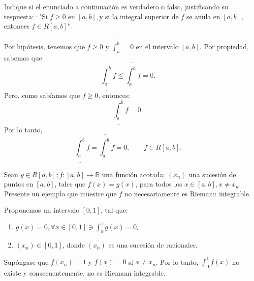 \begin{problema}
	Indique si el enunciado a continuación es verdadero o falso, justificando su
	respuesta:·"Si $f \geq 0$ en $[a, b], \mathrm{y}$ si la integral superior de $f$ se anula en $[a, b]$,
	entonces $f \in R[a, b]$".
\end{problema}
\begin{dem}
	Por hipótesis, tenemos que $f\geq 0$ y $\overline{\int_a^b}=0$ en el intervalo $[a,b]$. Por propiedad, sabemos que 
	$$ \underline{\int_a^b}f\leq \overline{\int_a^b}f=0.$$
	Pero, como sabíamos que $f\geq 0$, entonces: 
	$$\underline{\int_a^b}f=0.$$
	Por lo tanto, 
	$$\underline{\int_a^b}f= \overline{\int_a^b}f =0, \qquad f\in R[a,b].$$ 
\end{dem}





\begin{problema}
	 Sean $g \in R[a, b] ; f:[a, b] \rightarrow \mathbb{R}$ una función acotada; $\left(x_{n}\right)$ una sucesión de puntos
	en $[a, b]$, tales que $f(x)=g(x)$, para todos los $ x \in[a, b], x \neq x_{n} .$ Presente un ejemplo que muestre que $f$ no necesariamente es Riemann integrable.
\end{problema}
\begin{sol}
	Proponemos un intervalo $[0,1]$, tal que:
	\begin{enumerate}
		\item $g(x)=0, \forall x\in [0,1]\ni \int_0^1 g(x)=0$.
		\item $(x_n)\in [0,1]$, donde $(x_n)$ es una sucesión de racionales.  
	\end{enumerate}
Supóngase que $f(x_n)=1$ y $f(x)=0$ si $x\neq x_n$. Por lo tanto, $\int_0^1 f(x)$ no existe y consecuentemente, no es Riemann integrable. 
\end{sol}









